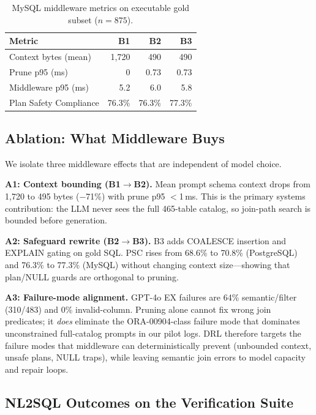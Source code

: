 \documentclass[twocolumn]{svjour3}
\begin{document}
\begin{table}[t]
\centering
\caption{MySQL middleware metrics on executable gold subset ($n{=}875$).}
\label{tab:mysql}
\small
\begin{tabular}{@{}lrrr@{}}
\toprule
\textbf{Metric} & \textbf{B1} & \textbf{B2} & \textbf{B3} \\
\midrule
Context bytes (mean) & 1{,}720 & 490 & 490 \\
Prune p95 (ms) & 0 & 0.73 & 0.73 \\
Middleware p95 (ms) & 5.2 & 6.0 & 5.8 \\
Plan Safety Compliance & 76.3\% & 76.3\% & 77.3\% \\
\bottomrule
\end{tabular}
\end{table}

\subsection{Ablation: What Middleware Buys}
\label{sec:ablation}

We isolate three middleware effects that are independent of model choice.

\textbf{A1: Context bounding (B1$\rightarrow$B2).}
Mean prompt schema context drops from 1{,}720 to 495 bytes ($-$71\%) with prune p95 $<$1\,ms.
This is the primary systems contribution: the LLM never sees the full 465-table catalog, so join-path search is bounded before generation.

\textbf{A2: Safeguard rewrite (B2$\rightarrow$B3).}
B3 adds COALESCE insertion and EXPLAIN gating on gold SQL.
PSC rises from 68.6\% to 70.8\% (PostgreSQL) and 76.3\% to 77.3\% (MySQL) without changing context size---showing that plan/NULL guards are orthogonal to pruning.

\textbf{A3: Failure-mode alignment.}
GPT-4o EX failures are 64\% semantic/filter (310/483) and 0\% invalid-column.
Pruning alone cannot fix wrong join predicates; it \emph{does} eliminate the ORA-00904-class failure mode that dominates unconstrained full-catalog prompts in our pilot logs.
DRL therefore targets the failure modes that middleware can deterministically prevent (unbounded context, unsafe plans, NULL traps), while leaving semantic join errors to model capacity and repair loops.

\subsection{NL2SQL Outcomes on the Verification Suite}
\end{document}
